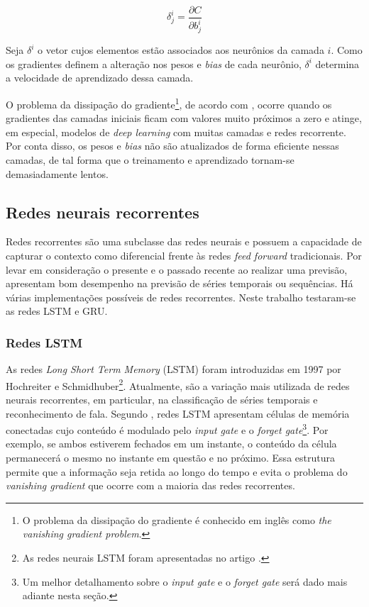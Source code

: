 \begin{equation}
  \delta_j^i = \frac{\partial C}{\partial b_j^i}
\label{eq:func_grad}
\end{equation}

Seja $\delta^i$ o vetor cujos elementos estão associados
aos neurônios da camada $i$. Como os gradientes definem a alteração nos pesos 
e \textit{bias}
de cada neurônio,  $\delta^i$  determina a velocidade de aprendizado dessa camada.

O problema da dissipação do gradiente\footnote{O problema da dissipação do gradiente 
é conhecido em inglês como \textit{the vanishing gradient problem}.
}, de acordo com \citet{deeplearningbook}, ocorre quando os gradientes das camadas iniciais ficam com valores 
muito próximos a zero e atinge, em especial, modelos 
de \textit{deep learning} com muitas camadas e redes recorrente. Por conta disso, os pesos e \textit{bias} não são atualizados
de forma eficiente nessas camadas, de tal forma que o treinamento e aprendizado
tornam-se demasiadamente lentos. 
        
\subsection{Redes neurais recorrentes}
\label{rnn}

Redes recorrentes são uma subclasse das redes neurais e possuem a capacidade
de capturar o contexto como diferencial frente às redes \textit{feed forward}
tradicionais. Por levar em consideração o presente e o passado recente ao 
realizar uma previsão, apresentam bom desempenho na previsão de séries 
temporais ou sequências. Há várias implementações possíveis de redes 
recorrentes. Neste trabalho testaram-se as redes LSTM e GRU.

\subsubsection{Redes LSTM}

As redes \textit{Long Short Term Memory} (LSTM) foram introduzidas em 1997 por Hochreiter 
e Schmidhuber\footnote{As redes neurais LSTM foram apresentadas no artigo \cite{lstm-origem}.}.
Atualmente, são a variação mais utilizada de redes
neurais recorrentes, em particular, na classificação de séries temporais e
reconhecimento de fala. Segundo \citet{deeplearningbook}, redes LSTM apresentam células de 
memória conectadas cujo conteúdo é modulado pelo \textit{input gate} e o \textit{forget gate}\footnote{Um 
melhor detalhamento sobre o \textit{input gate} e o \textit{forget gate} será 
dado mais adiante nesta seção.}.
Por exemplo, se ambos estiverem fechados em um instante, o conteúdo da célula permanecerá 
o mesmo no instante em questão e no próximo. Essa estrutura permite que a informação
seja retida ao longo do tempo e evita o problema do \textit{vanishing gradient} que 
ocorre com a maioria das redes recorrentes.

